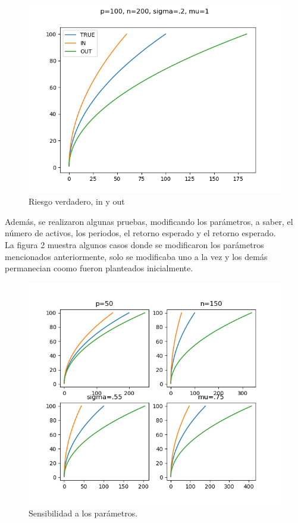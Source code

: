 \documentclass[paper=letter, fontsize=14pt]{scrartcl}
\numberwithin{equation}{section} %
\numberwithin{figure}{section} %
\numberwithin{table}{section} %
\begin{document}
\begin{figure}[h]
\centering
\includegraphics[scale=.75]{i1.png}
\caption{Riesgo verdadero, in y out} 
\end{figure}
\pagebreak

Además, se realizaron algunas pruebas, modificando los parámetros, a saber, el número de activos, los periodos, el retorno esperado y el retorno esperado.\\

La figura 2 muestra algunos casos donde se modificaron los parámetros mencionados anteriormente, solo se modificaba uno a la vez y los demás permanecian coomo fueron planteados inicialmente.

\begin{figure}[h]
\centering
\includegraphics[scale=.75]{i2.png}
\caption{Sensibilidad a los parámetros.} 
\end{figure}
\end{document}
